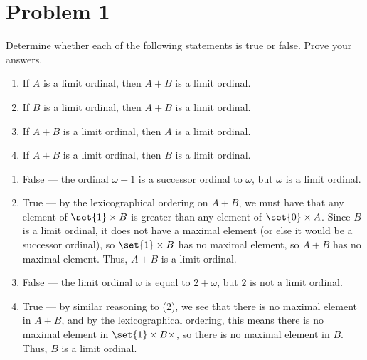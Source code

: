 \documentclass[10pt]{mypackage}
\begin{document}
\RaggedRight
\section{Problem 1}%
\begin{problem}
  Determine whether each of the following statements is true or false. Prove your answers.
  \begin{enumerate}[(1)]
    \item If $A$ is a limit ordinal, then $A+B$ is a limit ordinal.
    \item If $B$ is a limit ordinal, then $A+B$ is a limit ordinal.
    \item If $A+B$ is a limit ordinal, then $A$ is a limit ordinal.
    \item If $A+B$ is a limit ordinal, then $B$ is a limit ordinal.
  \end{enumerate}
\end{problem}
\begin{solution}\hfill
  \begin{enumerate}[(1)]
    \item False --- the ordinal $\omega + 1$ is a successor ordinal to $\omega$, but $\omega$ is a limit ordinal.
    \item True --- by the lexicographical ordering on $A+B$, we must have that any element of $ \set{1}\times B$ is greater than any element of $\set{0}\times A$. Since $B$ is a limit ordinal, it does not have a maximal element (or else it would be a successor ordinal), so $\set{1}\times B$ has no maximal element, so $A+B$ has no maximal element. Thus, $A+B$ is a limit ordinal.
    \item False --- the limit ordinal $\omega$ is equal to $2 + \omega$, but $2$ is not a limit ordinal.
    \item True --- by similar reasoning to (2), we see that there is no maximal element in $A + B$, and by the lexicographical ordering, this means there is no maximal element in $\set{1}\times B\times$, so there is no maximal element in $B$. Thus, $B$ is a limit ordinal.
  \end{enumerate}
\end{solution}
\end{document}
